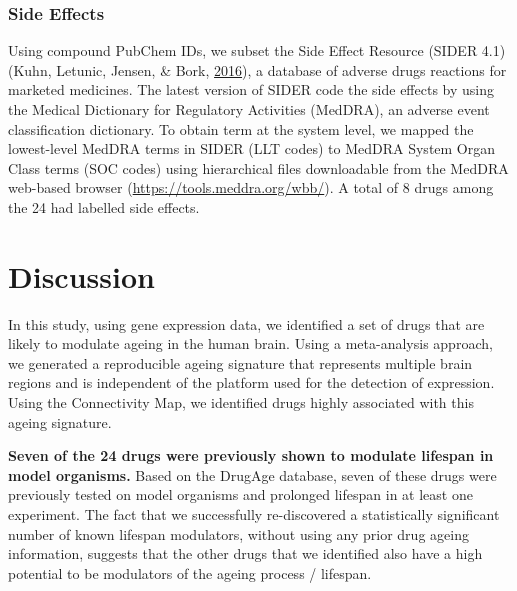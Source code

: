 \documentclass[12pt,twoside]{unicam}
\begin{document}
\hypertarget{side-effects}{%
\subsubsection{Side Effects}\label{side-effects}}

Using compound PubChem IDs, we subset the Side Effect Resource (SIDER 4.1) (Kuhn, Letunic, Jensen, \& Bork, \protect\hyperlink{ref-Kuhn2016}{2016}), a database of adverse drugs reactions for marketed medicines. The latest version of SIDER code the side effects by using the Medical Dictionary for Regulatory Activities (MedDRA), an adverse event classification dictionary. To obtain term at the system level, we mapped the lowest-level MedDRA terms in SIDER (LLT codes) to MedDRA System Organ Class terms (SOC codes) using hierarchical files downloadable from the MedDRA web-based browser (\url{https://tools.meddra.org/wbb/}). A total of 8 drugs among the 24 had labelled side effects.

\hypertarget{discussion-2}{%
\section{Discussion}\label{discussion-2}}

In this study, using gene expression data, we identified a set of drugs that are likely to modulate ageing in the human brain. Using a meta-analysis approach, we generated a reproducible ageing signature that represents multiple brain regions and is independent of the platform used for the detection of expression. Using the Connectivity Map, we identified drugs highly associated with this ageing signature.

\textbf{Seven of the 24 drugs were previously shown to modulate lifespan in model organisms.} Based on the DrugAge database, seven of these drugs were previously tested on model organisms and prolonged lifespan in at least one experiment. The fact that we successfully re-discovered a statistically significant number of known lifespan modulators, without using any prior drug ageing information, suggests that the other drugs that we identified also have a high potential to be modulators of the ageing process / lifespan.
\end{document}
